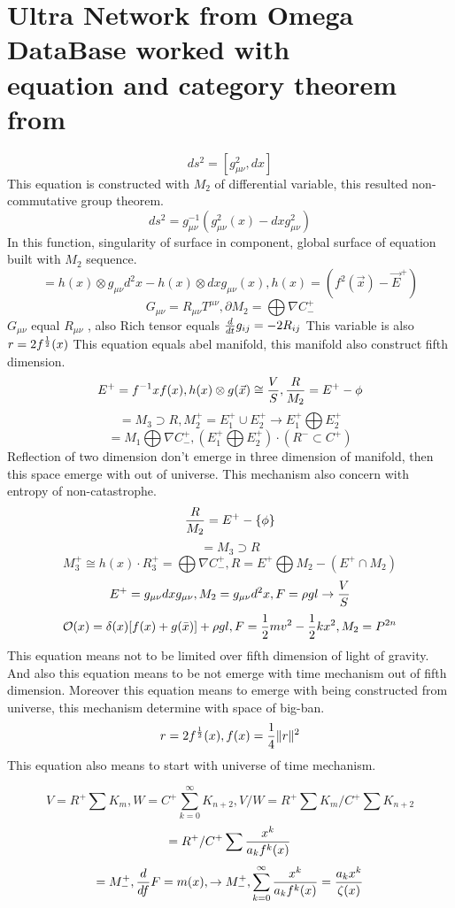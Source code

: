 \documentclass{jsarticle}
\begin{document}
\section{Ultra Network from Omega DataBase worked with \\
equation and category theorem from}
  $$ ds^2 = [g_{\mu\nu}^2, dx] $$
  This equation is constructed with $ M_2 $ of differential variable, this resulted non-commutative group theorem.
  $$ ds^2 = g_{\mu\nu}^{-1}(g^2_{\mu\nu}(x) - dx g_{\mu\nu}^2) $$
  In this function, singularity of surface in component, global surface of equation built with 
  $ M_2 $ sequence.
  $$ = h(x) \otimes g_{\mu\nu}d^2x - h(x) \otimes dx g_{\mu\nu}(x),
  h(x) = (f^2(\vec{x}) - \vec{E}^{+}) $$
  $$ G_{\mu\nu} = R_{\mu\nu}T^{\mu\nu},
   \partial M_2 = \bigoplus \nabla C^{+}_{-} $$
   $ G_{\mu\nu}  $ equal  $ R_{\mu\nu} $ , also Rich tensor equals  $ {d \over dt}g_{ij} = - 2 R_{ij} $
  This variable is also $ r = 2 f^{1 \over 2}(x) $
  This equation equals abel manifold, this manifold also construct fifth dimension.
  $$ E^{+} = f^{-1}xf(x), 
   h(x) \otimes g(\vec{x}) \cong {V \over S},
  {R \over M_2} = E^{+} - {\phi} $$
  $$ = M_3 \supset R,
   M^{+}_2 = E^{+}_{1} \cup E^{+}_{2} \to E^{+}_1 \bigoplus E^{+}_2 $$
  $$ = M_1 \bigoplus \nabla C^{+}_{-}, (E^{+}_{1} \bigoplus E^{+}_{2}) \cdot (R^{-} \subset C^{+}) $$
  Reflection of two dimension don't emerge in three dimension of manifold, then this space emerge with out of universe.
  This mechanism also concern with entropy of non-catastrophe.
  $$ {R \over M_2} = E^{+} - \{\phi\} $$
  $$ = M_3 \supset R $$
  $$ M^{+}_3 \cong h(x) \cdot R^{+}_3
  = \bigoplus \nabla C^{+}_{-}, 
  R = E^{+} \bigoplus M_2 - (E^{+} \cap M_2) $$
  $$ E^{+} = g_{\mu\nu}dxg_{\mu\nu},
   M_2 = g_{\mu\nu}d^2x,
   F = \rho g l \to {V \over S} $$
  $$ \mathcal{O}(x) = \delta(x)[f(x) + g(\bar{x})] + \rho g l,
   F = {1 \over 2}mv^2 - {1 \over 2}kx^2,
   M_2 = P^{2n} $$
  This equation means not to be limited over fifth dimension of light of gravity.
  And also this equation means to be not emerge with time mechanism out of fifth dimension.
  Moreover this equation means to emerge with being constructed from universe, this mechanism determine with space of big-ban.
  $$ r = 2f^{1 \over 2}(x),
  f(x) = {1 \over 4}\|r\|^2 $$
  This equation also means to start with universe of time mechanism.

  $$ V = R^{+}\sum K_m, W = C^{+}\sum^{\infty}_{k=0} K_{n+2}, V/W = R^{+}\sum K_m / C^{+}\sum K_{n+2} $$
  $$ = R^{+}/C^{+} \sum{x^k \over a_k f^k(x)} $$
  $$ = M^+_{-}, {d \over df} F = m(x), \to M^{+}_{-}, \sum^{\infty}_{k=0} {x^k \over a_k f^k(x)} = {a_k x^k \over 
  \zeta(x)} $$
\end{document}
